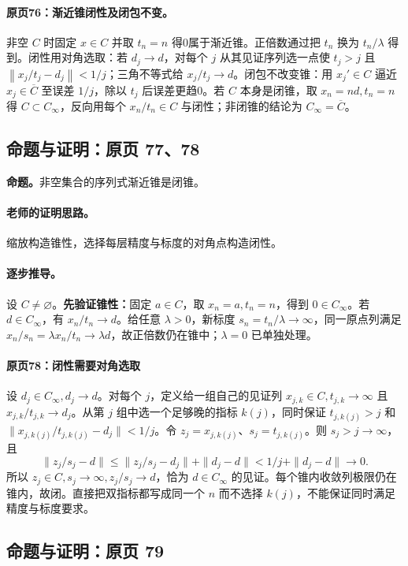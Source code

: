 \documentclass[11pt,a4paper]{article}
\newcommand{\norm}[1]{\left\lVert#1\right\rVert}
\theoremstyle{definition}\newtheorem{definition}{定义}\newtheorem{example}{例}
\begin{document}
\paragraph{原页76：渐近锥闭性及闭包不变。}非空 $C$ 时固定 $x\in C$ 并取 $t_n=n$ 得0属于渐近锥。正倍数通过把 $t_n$ 换为 $t_n/\lambda$ 得到。闭性用对角选取：若 $d_j\to d$，对每个 $j$ 从其见证序列选一点使 $t_j>j$ 且 $\norm{x_j/t_j-d_j}<1/j$；三角不等式给 $x_j/t_j\to d$。闭包不改变锥：用 $x_j'\in C$ 逼近 $x_j\in\overline C$ 至误差 $1/j$，除以 $t_j$ 后误差更趋0。若 $C$ 本身是闭锥，取 $x_n=nd,t_n=n$ 得 $C\subset C_\infty$，反向用每个 $x_n/t_n\in C$ 与闭性；非闭锥的结论为 $C_\infty=\overline C$。



\subsection{命题与证明：原页 77、78}

\textbf{命题。}非空集合的序列式渐近锥是闭锥。

\paragraph{老师的证明思路。}缩放构造锥性，选择每层精度与标度的对角点构造闭性。

\paragraph{逐步推导。}
设 $C\ne\varnothing$。\textbf{先验证锥性：}固定 $a\in C$，取 $x_n=a,t_n=n$，得到 $0\in C_\infty$。若 $d\in C_\infty$，有 $x_n/t_n\to d$。给任意 $\lambda>0$，新标度 $s_n=t_n/\lambda\to\infty$，同一原点列满足 $x_n/s_n=\lambda x_n/t_n\to\lambda d$，故正倍数仍在锥中；$\lambda=0$ 已单独处理。
\paragraph{原页78：闭性需要对角选取}
设 $d_j\in C_\infty,d_j\to d$。对每个 $j$，定义给一组自己的见证列 $x_{j,k}\in C,t_{j,k}\to\infty$ 且 $x_{j,k}/t_{j,k}\to d_j$。从第 $j$ 组中选一个足够晚的指标 $k(j)$，同时保证 $t_{j,k(j)}>j$ 和 $\|x_{j,k(j)}/t_{j,k(j)}-d_j\|<1/j$。令 $z_j=x_{j,k(j)}$、$s_j=t_{j,k(j)}$。则 $s_j>j\to\infty$，且
\[\|z_j/s_j-d\|\le\|z_j/s_j-d_j\|+\|d_j-d\|<1/j+\|d_j-d\|\to0.\]
所以 $z_j\in C,s_j\to\infty,z_j/s_j\to d$，恰为 $d\in C_\infty$ 的见证。每个锥内收敛列极限仍在锥内，故闭。直接把双指标都写成同一个 $n$ 而不选择 $k(j)$，不能保证同时满足精度与标度要求。


\subsection{命题与证明：原页 79}
\end{document}
